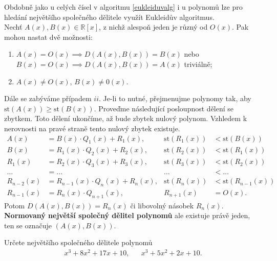 \begin{algoritmus}
  Obdobně jako u celých čísel v algoritmu \ref{eukleiduvalg} i u polynomů lze pro hledání největšího společného dělitele využít Eukleidův algoritmus.\\
  Nechť $A(x), B(x) \in \mathbb R [x]$, z nichž alespoň jeden je různý od $O(x)$. Pak mohou nastat dvě možnosti:
  \begin{enumerate}[$i.$]
    \item $A(x) = O(x) \implies D(A(x), B(x)) = B(x)$ nebo $B(x) = O(x) \implies D(A(x), B(x)) = A(x)$ triviálně;
    \item $A(x)\ne O(x)$, $B(x) \ne 0(x)$.
  \end{enumerate}
  Dále se zabýváme případem $ii$. Je-li to nutné, přejmenujme polynomy tak, aby $\text{st}(A(x)) \geq \text{st}(B(x))$.
  Proveďme následující posloupnost dělení se zbytkem. Toto dělení ukončíme, až bude zbytek nulový polynom.
  Vzhledem k nerovnosti na pravé straně tento nulový zbytek existuje.
  \begin{align*}
    A(x) & = B(x) \cdot Q_1(x) + R_1(x),  & \text{st}(R_1(x)) & < \text{st}(B(x)) \\
    B(x) & = R_1(x) \cdot Q_2(x) + R_2(x), & \text{st}(R_2(x)) & < \text{st}(R_1(x)) \\
    R_1(x) & = R_2(x) \cdot Q_3(x) + R_3(x), & \text{st}(R_3(x)) & < \text{st}(R_2(x))\\
    \dots & = \dots & \dots & < \dots\\
    R_{n-2}(x) & = R_{n-1}(x) \cdot Q_n(x) + R_n(x), & \text{st}(R_n(x)) & < \text{st}(R_{n-1}(x)) \\
    R_{n-1}(x) & = R_{n}(x) \cdot Q_{n+1}(x), & R_{n+1}(x) & = O(x).
  \end{align*}
  Potom $D(A(x), B(x)) = R_n(x)$ či libovolný násobek $R_n(x)$. \textbf{Normovaný největší společný dělitel polynomů}
  ale existuje právě jeden, ten se označuje $(A(x), B(x))$.
\end{algoritmus}

\begin{priklad}
    Určete největšího společného dělitele polynomů
    \begin{align*}
        x^3+8x^2+17x+10,& &   x^3+5x^2+2x+10.
    \end{align*}
\end{priklad}

